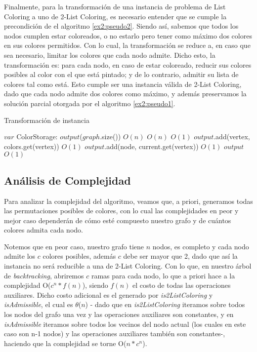 \documentclass{article}
\theoremstyle{definition}
\theoremstyle{remark}
\begin{document}
Finalmente, para la transformación de una instancia de problema de List Coloring a uno de 2-List Coloring, es necesario entender que se cumple la precondición de el algoritmo \ref{ex2:pseudo2}. Siendo así, sabemos que todos los nodos cumplen estar coloreados, o no estarlo pero tener como máximo dos colores en sus colores permitidos. Con lo cual, la transformación se reduce a, en caso que sea necesario, limitar los colores que cada nodo admite.
Dicho esto, la transformación es: para cada nodo, en caso de estar coloreado, reducir sus colores posibles al color con el que está pintado; y de lo contrario, admitir su lista de colores tal como está.
Esto cumple ser una instancia válida de 2-List Coloring, dado que cada nodo admite dos colores como máximo, y además preservamos la solución parcial otorgada por el algoritmo \ref{ex2:pseudo1}.


\begin{algorithm}
\caption{Transformación de instancia}
\label{ex2:pseudo3}

\begin{algorithmic}
\State $var$ ColorStorage: $output$($graph$.size()) \Comment $O(n)$
 \Comment $O(n)$
     \Comment $O(1)$
        \State $output$.add(vertex, colors.get(vertex)) \Comment $O(1)$
    \Else
        \State $output$.add(node, current.get(vertex)) \Comment $O(1)$
    \EndIf
\EndFor
\State \Return $output$ \Comment $O(1)$
\EndFunction
\end{algorithmic}
\end{algorithm}

\subsection{Análisis de Complejidad}
Para analizar la complejidad del algoritmo, veamos que, a priori, generamos todas las permutaciones posibles de colores, con lo cual las complejidades en peor y mejor caso dependerán de cómo esté compuesto nuestro grafo y de cuántos colores admita cada nodo.

Notemos que en peor caso, nuestro grafo tiene $n$ nodos, es completo y cada nodo admite los $c$ colores posibles, además $c$ debe ser mayor que 2, dado que así la instancia no será reducible a una de 2-List Coloring. Con lo que, en nuestro árbol de \textit{backtracking}, abriremos $c$ ramas para cada nodo, lo que a priori hace a la complejidad O($c^{n}*f(n)$), siendo $f(n)$ el costo de todas las operaciones auxiliares. Dicho costo adicional es el generado por \textit{is2ListColoring} y \textit{isAdmissible}, el cual es $\theta$($n$) - dado que en \textit{is2ListColoring} iteramos sobre todos los nodos del grafo una vez y las operaciones auxiliares son constantes, y en \textit{isAdmissible} iteramos sobre todos los vecinos del nodo actual (los cuales en este caso son n-1 nodos) y las operaciones auxiliares también son constantes-, haciendo que la complejidad se torne O($n*c^{n}$).
\end{document}
